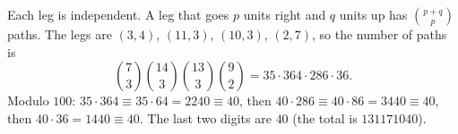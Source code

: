 Each leg is independent. A leg that goes $p$ units right and $q$ units up has $\binom{p+q}{p}$ paths. The legs are $(3,4)$, $(11,3)$, $(10,3)$, $(2,7)$, so the number of paths is
\[
\binom73\binom{14}{3}\binom{13}3\binom92=35\cdot364\cdot286\cdot36 .
\]
Modulo $100$: $35\cdot364\equiv35\cdot64=2240\equiv40$, then $40\cdot286\equiv40\cdot86=3440\equiv40$, then $40\cdot36=1440\equiv40$. The last two digits are $\boxed{40}$ (the total is $131171040$).
